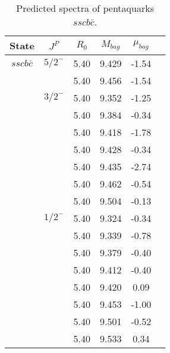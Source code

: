 \documentclass[prd,twocolumn,floatfix,nofootinbib]{revtex4}
\begin{document}
\begin{table*}[!htbp]
    \caption{Predicted spectra of pentaquarks $sscb\bar{c }$.}
    \begin{tabular}{cccccc}
        \hline\hline
        {\rm State} &$J^{P}$ &$R_{0}$ &$M_{bag}$ &$\mu_{bag}$  \\ \hline
        $sscb\bar{c}$
            &${5/2}^{-}$     &5.40   &9.429 &-1.54 \\ 
                         &$ $     &5.40   &9.456 &-1.54 \\                         
            &${3/2}^{-}$     &5.40   &9.352 &-1.25 \\
                         &$ $     &5.40   &9.384 &-0.34  \\
                         &$ $     &5.40   &9.418 &-1.78  \\
                         &$ $     &5.40   &9.428 &-0.34 \\
                         &$ $     &5.40   &9.435 &-2.74  \\
                         &$ $     &5.40   &9.462 &-0.54  \\
                         &$ $     &5.40   &9.504 &-0.13 \\                        
            &${1/2}^{-}$     &5.40   &9.324 &-0.34  \\
                         &$ $     &5.40   &9.339 &-0.78  \\
                         &$ $     &5.40   &9.379 &-0.40 \\
                         &$ $     &5.40   &9.412 &-0.40 \\
                         &$ $     &5.40   &9.420 &0.09  \\
                         &$ $     &5.40   &9.453 &-1.00 \\
                         &$ $     &5.40   &9.501 &-0.52 \\                         
                         &$ $     &5.40   &9.533 &0.34 \\                          
       \hline\hline
    \end{tabular}
\end{table*}
\end{document}
